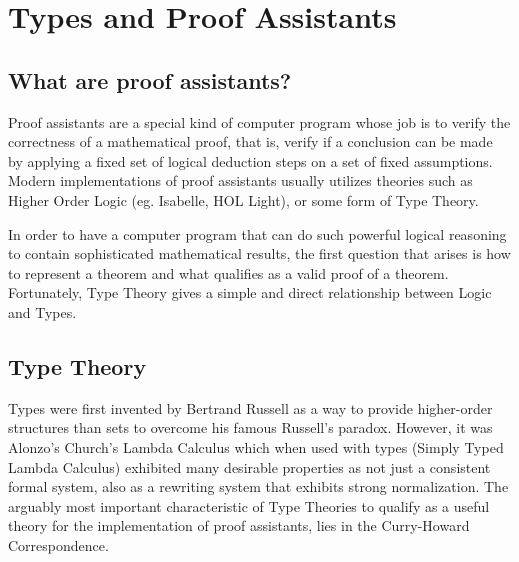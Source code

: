 \chapter{Types and Proof Assistants}

\section{What are proof assistants?}
Proof assistants are a special kind of computer program whose job
is to verify the correctness of a mathematical proof, that is,
verify if a conclusion can be made by applying a fixed set
of logical deduction steps on a set of fixed assumptions. Modern 
implementations of proof assistants usually utilizes theories such as 
Higher Order Logic (eg. Isabelle, HOL Light), or some form of Type Theory.

In order to have a computer program that can do such powerful logical
reasoning to contain sophisticated mathematical results, the first 
question that arises is how to represent a theorem and what qualifies
as a valid proof of a theorem. Fortunately, Type Theory gives a simple
and direct relationship between Logic and Types.

\section{Type Theory}

Types were first invented by Bertrand Russell as a way to provide higher-order
structures than sets to overcome his famous Russell's paradox. However, it was
Alonzo's Church's Lambda Calculus which when used with types (Simply Typed
Lambda Calculus) exhibited many desirable properties as not just a consistent
formal system, also as a rewriting system that exhibits strong normalization.
The arguably most important characteristic of Type Theories to qualify as a 
useful theory for the implementation of proof assistants, lies in the
Curry-Howard Correspondence.

